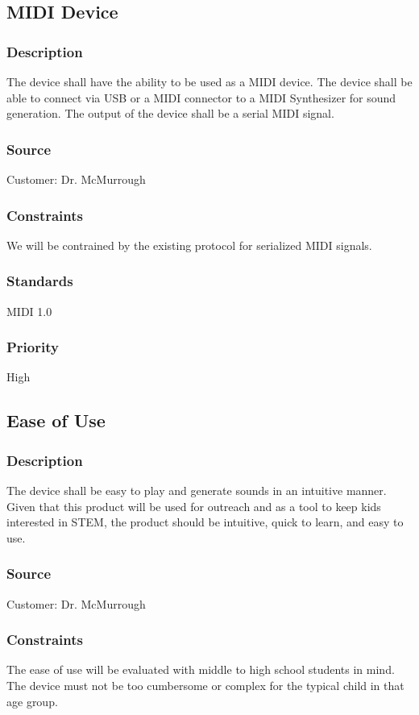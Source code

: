 \subsection{MIDI Device}
\subsubsection{Description}
The device shall have the ability to be used as a MIDI device. The device shall be able to connect via USB or a MIDI connector to a MIDI Synthesizer for sound generation. The output of the device shall be a serial MIDI signal.
\subsubsection{Source}
Customer: Dr. McMurrough
\subsubsection{Constraints}
We will be contrained by the existing protocol for serialized MIDI signals. 
\subsubsection{Standards}
MIDI 1.0
\subsubsection{Priority}
High

\subsection{Ease of Use}
\subsubsection{Description}
The device shall be easy to play and generate sounds in an intuitive manner. Given that this product will be used for outreach and as a tool to keep kids interested in STEM, the product should be intuitive, quick to learn, and easy to use. 
\subsubsection{Source}
Customer: Dr. McMurrough
\subsubsection{Constraints}
The ease of use will be evaluated with middle to high school students in mind. The device must not be too cumbersome or complex for the typical child in that age group.

